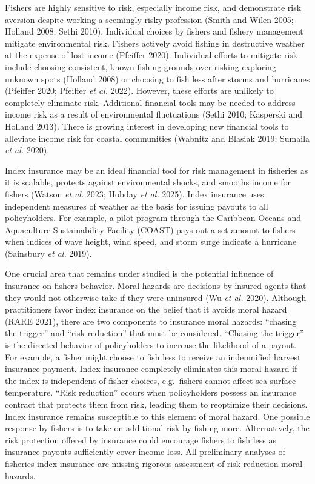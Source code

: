 \documentclass[
  letterpaper,
  DIV=11,
  numbers=noendperiod]{scrartcl}
\theoremstyle{plain}
\theoremstyle{plain}
\theoremstyle{remark}
\begin{document}
Fishers are highly sensitive to risk, especially income risk, and
demonstrate risk aversion despite working a seemingly risky profession
(Smith and Wilen 2005; Holland 2008; Sethi 2010). Individual choices by
fishers and fishery management mitigate environmental risk. Fishers
actively avoid fishing in destructive weather at the expense of lost
income (Pfeiffer 2020). Individual efforts to mitigate risk include
choosing consistent, known fishing grounds over risking exploring
unknown spots (Holland 2008) or choosing to fish less after storms and
hurricanes (Pfeiffer 2020; Pfeiffer \emph{et al.} 2022). However, these
efforts are unlikely to completely eliminate risk. Additional financial
tools may be needed to address income risk as a result of environmental
fluctuations (Sethi 2010; Kasperski and Holland 2013). There is growing
interest in developing new financial tools to alleviate income risk for
coastal communities (Wabnitz and Blasiak 2019; Sumaila \emph{et al.}
2020).

Index insurance may be an ideal financial tool for risk management in
fisheries as it is scalable, protects against environmental shocks, and
smooths income for fishers (Watson \emph{et al.} 2023; Hobday \emph{et
al.} 2025). Index insurance uses independent measures of weather as the
basis for issuing payouts to all policyholders. For example, a pilot
program through the Caribbean Oceans and Aquaculture Sustainability
Facility (COAST) pays out a set amount to fishers when indices of wave
height, wind speed, and storm surge indicate a hurricane (Sainsbury
\emph{et al.} 2019).

One crucial area that remains under studied is the potential influence
of insurance on fishers behavior. Moral hazards are decisions by insured
agents that they would not otherwise take if they were uninsured (Wu
\emph{et al.} 2020). Although practitioners favor index insurance on the
belief that it avoids moral hazard (RARE 2021), there are two components
to insurance moral hazards: ``chasing the trigger'' and ``risk
reduction'' that must be considered. ``Chasing the trigger'' is the
directed behavior of policyholders to increase the likelihood of a
payout. For example, a fisher might choose to fish less to receive an
indemnified harvest insurance payment. Index insurance completely
eliminates this moral hazard if the index is independent of fisher
choices, e.g.~fishers cannot affect sea surface temperature. ``Risk
reduction'' occurs when policyholders possess an insurance contract that
protects them from risk, leading them to reoptimize their decisions.
Index insurance remains susceptible to this element of moral hazard. One
possible response by fishers is to take on additional risk by fishing
more. Alternatively, the risk protection offered by insurance could
encourage fishers to fish less as insurance payouts sufficiently cover
income loss. All preliminary analyses of fisheries index insurance are
missing rigorous assessment of risk reduction moral hazards.
\end{document}
